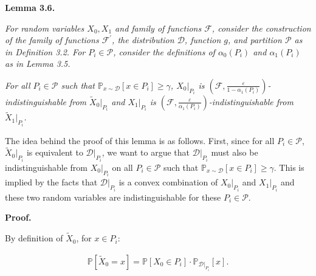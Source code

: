 

\par\medskip\noindent\textbf{
\textbf{Lemma 3.6}\textbf{.}
}\par



\emph{For random variables $X_{0},X_{1}$ and family of functions $\mathcal{F}$, consider the construction of the family of functions $\mathcal{F}^{\prime}$, the distribution $\mathcal{D}$, function $g$, and partition $\mathcal{P}$ as in Definition 3.2. For $P_{i}\in\mathcal{P}$, consider the definitions of $\alpha_{0}(P_{i})$ and $\alpha_{1}(P_{i})$ as in Lemma 3.5.}\par




\emph{For all $P_{i}\in\mathcal{P}$ such that $\mathbb{P}_{x\sim\mathcal{D}}[x\in P_{i}]\geq\gamma$, $X_{0}|_{P_{i}}$ is $(\mathcal{F},\frac{\varepsilon}{1-\alpha_{1}(P_{i})})$-indistinguishable from $\widetilde{X}_{0}|_{P_{i}}$ and $X_{1}|_{P_{i}}$ is $(\mathcal{F},\frac{\varepsilon}{\alpha_{1}(P_{i})})$-indistinguishable from $\widetilde{X}_{1}|_{P_{i}}$.}\par






The idea behind the proof of this lemma is as follows. First, since for all $P_{i}\in\mathcal{P}$, $\widetilde{X}_{0}|_{P_{i}}$ is equivalent to $\mathcal{D}|_{P_{i}}$, we want to argue that $\mathcal{D}|_{P_{i}}$ must also be indistinguishable from $X_{0}|_{P_{i}}$ on all $P_{i}\in\mathcal{P}$ such that $\mathbb{P}_{x\sim\mathcal{D}}[x\in P_{i}]\geq\gamma$. This is implied by the facts that $\mathcal{D}|_{P_{i}}$ is a convex combination of $X_{0}|_{P_{i}}$ and $X_{1}|_{P_{i}}$ and these two random variables are indistinguishable for these $P_{i}\in\mathcal{P}$.\par





\par\medskip\noindent\textbf{Proof.}\par




By definition of $\widetilde{X}_{0}$, for $x\in P_{i}$:\par


\[\begin{gathered}
\mathbb{P}[\widetilde{X}_{0}=x]=\mathbb{P}[X_{0}\in P_{i}]\cdot\mathbb{P}_{\mathcal{D}|_{P_{i}}}[x].
\end{gathered}\]


